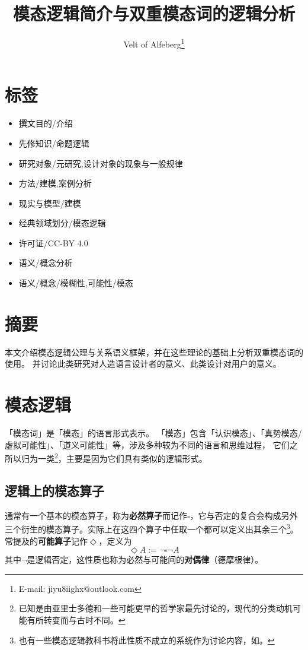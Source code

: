 \documentclass[fontset=ubuntu]{ctexart}
\begin{document}
	\title{模态逻辑简介与双重模态词的逻辑分析}
	\author{Velt of Alfeberg\footnote{E-mail: jiyu8iighx@outlook.com}}

	\maketitle
	
	\section*{标签}
		\begin{itemize}
			\item 撰文目的/介绍
			\item 先修知识/命题逻辑
			\item 研究对象/元研究,设计对象的现象与一般规律
			\item 方法/建模,案例分析
			\item 现实与模型/建模
			\item 经典领域划分/模态逻辑
			\item 许可证/CC-BY 4.0
			\item 语义/概念分析
			\item 语义/概念/模糊性,可能性/模态
		\end{itemize}
	\section*{摘要}
		本文介绍模态逻辑公理与关系语义框架，并在这些理论的基础上分析双重模态词的使用。
		并讨论此类研究对人造语言设计者的意义、此类设计对用户的意义。

	\newpage

	\section{模态逻辑}

		「模态词」是「模态」的语言形式表示。
		「模态」包含「认识模态」、「真势模态/虚拟可能性」、「道义可能性」等，涉及多种较为不同的语言和思维过程，
		它们之所以归为一类\footnote{已知是由亚里士多德和一些可能更早的哲学家最先讨论的，现代的分类动机可能有所转变而与古时不同。}，主要是因为它们具有类似的逻辑形式。

		\subsection{逻辑上的模态算子}

			通常有一个基本的模态算子，称为\textbf{必然算子}而记作\(\square\)，它与否定的复合会构成另外三个衍生的模态算子。实际上在这四个算子中任取一个都可以定义出其余三个\footnote{也有一些模态逻辑教科书将此性质不成立的系统作为讨论内容，如\citet{cresswell2012new}。}。常提及的\textbf{可能算子}记作\(\Diamond\)，定义为
			\begin{equation}
				\Diamond A := \lnot\square\lnot A
			\end{equation}
			其中\(\lnot\)是逻辑否定，这性质也称为必然与可能间的\textbf{对偶律}（德摩根律）。
\end{document}
